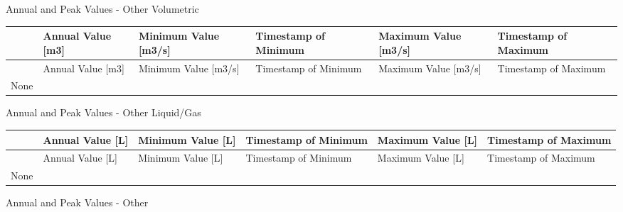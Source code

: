 Annual and Peak Values - Other Volumetric

\begin{longtable}[c]{>{\raggedright}p{1.0in}>{\raggedright}p{1.0in}>{\raggedright}p{1.0in}>{\raggedright}p{1.0in}>{\raggedright}p{1.0in}>{\raggedright}p{1.0in}}
\toprule 
 & Annual Value [m3] & Minimum Value [m3/s] & Timestamp of Minimum & Maximum Value [m3/s] & Timestamp of Maximum \tabularnewline
\midrule
\endfirsthead

\toprule 
 & Annual Value [m3] & Minimum Value [m3/s] & Timestamp of Minimum & Maximum Value [m3/s] & Timestamp of Maximum \tabularnewline
\midrule
\endhead

None & ~ & ~ & ~ & ~ & ~ \tabularnewline
\bottomrule
\end{longtable}

Annual and Peak Values - Other Liquid/Gas

\begin{longtable}[c]{>{\raggedright}p{1.0in}>{\raggedright}p{1.0in}>{\raggedright}p{1.0in}>{\raggedright}p{1.0in}>{\raggedright}p{1.0in}>{\raggedright}p{1.0in}}
\toprule 
 & Annual Value [L] & Minimum Value [L] & Timestamp of Minimum & Maximum Value [L] & Timestamp of Maximum \tabularnewline
\midrule
\endfirsthead

\toprule 
 & Annual Value [L] & Minimum Value [L] & Timestamp of Minimum & Maximum Value [L] & Timestamp of Maximum \tabularnewline
\midrule
\endhead

None & ~ & ~ & ~ & ~ & ~ \tabularnewline
\bottomrule
\end{longtable}

Annual and Peak Values - Other

